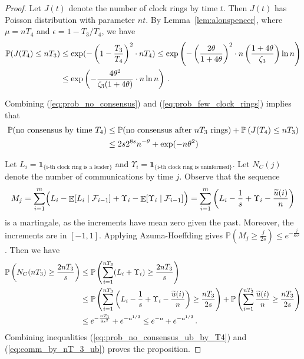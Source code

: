 \documentclass[a4paper,12pt]{article}
\DeclareMathOperator{\Ex}{\mathbb{E}}%
\begin{document}
\begin{proof}
Let $J(t)$ denote the number of clock rings by time $t$. Then $J(t)$ has Poisson distribution with parameter $nt$. By Lemma~\ref{lem:alonspencer}, where $\mu = nT_4$ and $\epsilon = 1 - T_3/T_4$, we have
\begin{align} \label{eq:prob_few_clock_rings}
\mathbb{P}(J(T_4) \leq n T_3) & \leq \exp(- \left( 1 - \frac{T_3}{T_4}\right)^2 \cdot nT_4) \leq \exp\left(-\left(\frac{2\theta}{1 + 4 \theta}\right)^2 \cdot n\left(\frac{1+4\theta}{\zeta_3}\right) \ln{n}\right) \notag \\
& \leq \exp\left(- \frac{4 \theta^2}{\zeta_3(1+4\theta)} \cdot n \ln{n}\right) \,.
\end{align}

\smallskip

Combining (\ref{eq:prob_no_consensus}) and (\ref{eq:prob_few_clock_rings}) implies that
\begin{align} \label{eq:prob_no_consensus_ub_by_T4}
\mathbb{P}(\mbox{no consensus by time } T_4) & \leq \mathbb{P}(\mbox{no consensus after } n T_3 \mbox{ rings}) + \mathbb{P}\left(J(T_4) \leq n T_3\right)  \notag \\
& \leq 2s 2^{8s} n^{-\theta}  + \exp(-n\theta^2)
\end{align}

Let $L_i = \textbf{1}_{\{\mbox{i-th clock ring is a leader}\}}$ and $\Upsilon_i = \textbf{1}_{\{\mbox{i-th clock ring is uninformed}\}}$. Let $N_{C}(j)$ denote the number of communications by time $j$. Observe that the sequence $$M_j = \sum_{i=1}^{m} \Bigl(L_i - \Ex[L_i \mid \mathcal{F}_{i-1}] +  \Upsilon_i -\Ex[\Upsilon_i \mid \mathcal{F}_{i-1}]\Bigr) = \sum_{i=1}^{m} \left(L_i - \frac{1}{s} +  \Upsilon_i -\frac{\widetilde{u}(i)}{n}\right)$$ is a martingale, as the increments have mean zero given the past. Moreover, the increments are in $[-1, 1]$. Applying Azuma-Hoeffding gives
$\mathbb{P}\left(M_j \geq \frac{j}{2s}\right) \leq e^{-\frac{j}{8s^2}}$. Then we have
\begin{align} \label{eq:comm_by_nT_3_ub}
\mathbb{P}\left( N_C(nT_3) \geq \frac{2nT_3}{s} \right) & \leq \mathbb{P}\left( \sum_{i=1}^{n T_3} (L_i + \Upsilon_i) \geq \frac{2n T_3}{s} \right) \notag \\
& \leq \mathbb{P}\left(\sum_{i=1}^{n T_3} \left(L_i - \frac{1}{s} + \Upsilon_i - \frac{\widetilde{u}(i)}{n}\right) \geq \frac{ n T_3}{2s} \right) +  \mathbb{P}\left(\sum_{i=1}^{n T_3} \frac{\widetilde{u}(i)}{n} \geq \frac{n T_3}{2s} \right) \notag \\
& \leq e^{-\frac{n T_3}{8s^2}} + e^{-n^{1/3}} \leq e^{-{n}} + e^{-n^{1/3}} \,.
\end{align}
Combining inequalities (\ref{eq:prob_no_consensus_ub_by_T4}) and (\ref{eq:comm_by_nT_3_ub}) proves the proposition.
\end{proof}
\end{document}
